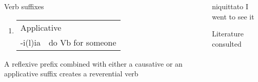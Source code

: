 \documentclass[12pt]{beamer}
\newcommand{\nah}[1]{\textcolor{nahgrn}{#1}}
\newcommand{\trs}[1]{\textcolor{nahblu}{#1}}
\begin{document}
\begin{frame}
\begin{columns}[t]
\begin{column}{.18\linewidth}
\begin{block}{Verb suffixes}
\begin{enumerate}
                        \item
                          \begin{tabular}[t]{ll}
                            \multicolumn{2}{l}{Applicative}\\
                            \nah{-i(l)ia} & \trs{do Vb for someone}
                          \end{tabular}
                        \end{enumerate}
                        A reflexive prefix combined with either a causative or an applicative suffix creates a reverential verb
                      \end{block}

                    \end{column}
                    \begin{column}{.18\linewidth}
                      \begin{example}
                        \nah{niquittato} \trs{I went to see it}
                        
                      \end{example}
                      \begin{block}{Literature consulted}
                        \nocite{lockhart_NahuatlWrittenLessons2001,andrews_ClaNahuatl03,jordan_BriefNotesNahuatl}
                        \printbibliography
                        
                      \end{block}
                    \end{column}
                  \end{columns}
                  \vfill
                \end{frame}
              
\end{document}
